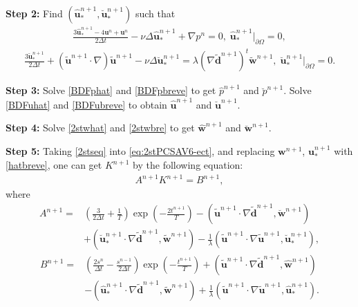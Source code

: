 \documentclass[12pt,reqno]{amsart}
\numberwithin{equation}{section}
\newcommand{\uu}{\mathrm{\textbf{u}}}
\newcommand{\dd}{\mathrm{\textbf{d}}}
\newcommand{\ww}{\mathrm{\textbf{w}}}
\begin{document}
\textbf{Step 2:} Find $(\hat{\uu}_*^{n+1},\breve{\uu}_*^{n+1})$ such that
\begin{equation}\label{PCSAV-ECT Subproblems 3}
\begin{split}
\frac{3\hat{\uu}_*^{n+1}-4\uu^n+\uu^{n}}{2\Delta t} -\nu\Delta\hat{\uu}_*^{n+1}+\nabla p^n = 0,\;\hat{\uu}_*^{n+1}|_{\partial\Omega}=0,
\end{split}
\end{equation}
\begin{equation}\label{PCSAV-ECT Subproblems 4}
\begin{split}
\frac{3\breve{\uu}_*^{n+1}}{2\Delta t} + \left(\tilde{\uu}^{n+1}\cdot\nabla\right)\tilde{\uu}^{n+1}-\nu\Delta\breve{\uu}_*^{n+1}= \lambda\left(\nabla\tilde{\dd}^{n+1}\right)^t\tilde{\ww}^{n+1},\;\breve{\uu}_*^{n+1}|_{\partial\Omega}=0.
\end{split}
\end{equation}

\textbf{Step 3:} Solve \eqref{BDFphat} and \eqref{BDFpbreve} to get
$\hat{p}^{n+1}$ and $\breve{p}^{n+1}$. Solve \eqref{BDFuhat} and \eqref{BDFubreve} to obtain
$\hat{\uu}^{n+1}$ and $\breve{\uu}^{n+1}$.

\textbf{Step 4:} Solve 
\eqref{2stwhat} and \eqref{2stwbre} to get
$\hat{\ww}^{n+1}$ and $\breve{\ww}^{n+1}$.

\textbf{Step 5:} Taking \eqref{2stseq} into \eqref{eq:2stPCSAV6-ect}, and replacing $\ww^{n+1}$, $\uu_*^{n+1}$ with \eqref{hatbreve}, 
one can get $K^{n+1}$ by the following equation:
\begin{align}\label{2stK^n+1-ect}
A^{n+1}K^{n+1} = B^{n+1} ,
\end{align}
where
\begin{align}\label{2stAn+1-ect}
A^{n+1} =&  
\left(\frac{3}{2\Delta t}+\frac{1}{T}\right)\exp\left(-\frac{2t^{n+1}}{T}\right) 
-\left( \tilde{\uu}^{n+1} \cdot \nabla \tilde{\dd}^{n+1}, \breve{\ww}^{n+1}\right)\nonumber\\
&+\left(\breve{\uu}_*^{n+1}\cdot \nabla \tilde{\dd}^{n+1},\tilde{\ww}^{n+1}\right)
-\frac{1}{\lambda}\left(\tilde{\uu}^{n+1} \cdot \nabla \tilde{\uu}^{n+1} ,\breve{\uu}_*^{n+1}\right)
,
\end{align}
\begin{align}
B^{n+1} =&  \left(\frac{2s^{n}}{\Delta t}-\frac{s^{n-1}}{2\Delta t}\right) \exp\left(-\frac{t^{n+1}}{T}\right)
+ \left( \tilde{\uu}^{n+1}\cdot \nabla \tilde{\dd}^{n+1},\hat{\ww}^{n+1}\right)\nonumber\\
&- \left(\hat{\uu}_*^{n+1} \cdot \nabla \tilde{\dd}^{n+1},\tilde{\ww}^{n+1}\right)
+\frac{1}{\lambda}\left(\tilde{\uu}^{n+1} \cdot \nabla \tilde{\uu}^{n+1} ,\hat{\uu}_*^{n+1}\right).
\end{align}
\end{document}
